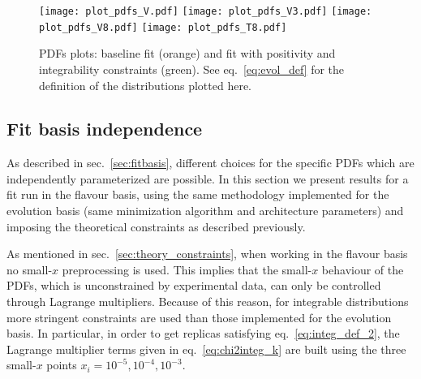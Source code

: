 \begin{figure}[t!]
    \begin{center}
        \texttt{[image: plot\_pdfs\_V.pdf]}
        \texttt{[image: plot\_pdfs\_V3.pdf]}
        \texttt{[image: plot\_pdfs\_V8.pdf]}
        \texttt{[image: plot\_pdfs\_T8.pdf]}
        \caption{PDFs plots: baseline fit (orange) and fit with positivity and integrability constraints (green).
        See eq.~\eqref{eq:evol_def} for the definition of the distributions plotted here.} 
        \label{fig:pdfs_plots} 
    \end{center}
\end{figure}


\subsection{Fit basis independence}
As described in sec.~\ref{sec:fitbasis}, different choices for the specific PDFs which are independently
parameterized are possible.
In this section we present results for a fit run in the flavour basis, using the same methodology
implemented for the evolution basis (same minimization algorithm and architecture parameters) 
and imposing the theoretical constraints as described previously.

%
As mentioned in sec.~\ref{sec:theory_constraints}, when working in the flavour basis 
no small-$x$ preprocessing is used. This implies that the small-$x$ behaviour of the PDFs, which is unconstrained 
by experimental data, can only be controlled through Lagrange multipliers.
Because of this reason, for integrable distributions more stringent constraints are used than those implemented
for the evolution basis. In particular, in order to get replicas satisfying eq.~\eqref{eq:integ_def_2},
the Lagrange multiplier terms given in eq.~\eqref{eq:chi2integ_k} are built using the three small-$x$
points $x_i = 10^{-5}, 10^{-4}, 10^{-3}$. 

